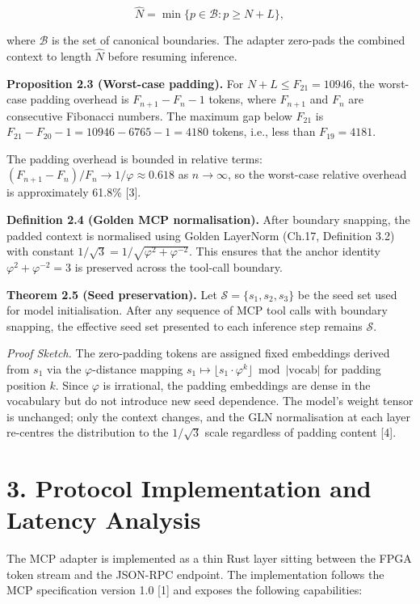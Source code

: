 \[\hat{N} = \min \{ p \in \mathcal{B} : p \geq N + L \},\]

where \(\mathcal{B}\) is the set of canonical
boundaries. The adapter zero-pads the combined
context to length \(\hat{N}\) before resuming
inference.

\textbf{Proposition 2.3 (Worst-case padding).} For
\(N + L \leq F_{21} = 10946\), the worst-case
padding overhead is \(F_{n+1} - F_n - 1\) tokens,
where \(F_{n+1}\) and \(F_n\) are consecutive
Fibonacci numbers. The maximum gap below
\(F_{21}\) is
\(F_{21} - F_{20} - 1 = 10946 - 6765 - 1 = 4180\)
tokens, i.e., less than \(F_{19} = 4181\).

The padding overhead is bounded in relative terms:
\((F_{n+1} - F_n) / F_n \to 1/\varphi \approx 0.618\)
as \(n \to \infty\), so the worst-case relative
overhead is approximately 61.8\% [3].

\textbf{Definition 2.4 (Golden MCP
normalisation).} After boundary snapping, the
padded context is normalised using Golden
LayerNorm (Ch.17, Definition 3.2) with constant
\(1/\sqrt{3} = 1/\sqrt{\varphi^2 + \varphi^{-2}}\).
This ensures that the anchor identity
\(\varphi^2 + \varphi^{-2} = 3\) is preserved
across the tool-call boundary.

\textbf{Theorem 2.5 (Seed preservation).} Let
\(\mathcal{S} = \{s_1, s_2, s_3\}\) be the seed
set used for model initialisation. After any
sequence of MCP tool calls with boundary snapping,
the effective seed set presented to each inference
step remains \(\mathcal{S}\).

\emph{Proof Sketch.} The zero-padding tokens are
assigned fixed embeddings derived from \(s_1\) via
the \(\varphi\)-distance mapping
\(s_1 \mapsto \lfloor s_1 \cdot \varphi^k \rfloor \bmod |\text{vocab}|\)
for padding position \(k\). Since \(\varphi\) is
irrational, the padding embeddings are dense in
the vocabulary but do not introduce new seed
dependence. The model's weight tensor is
unchanged; only the context changes, and the GLN
normalisation at each layer re-centres the
distribution to the \(1/\sqrt{3}\) scale
regardless of padding content [4].

\section{3. Protocol Implementation and Latency
Analysis}\label{fa_23:protocol-implementation-and-latency-analysis}

The MCP adapter is implemented as a thin Rust
layer sitting between the FPGA token stream and
the JSON-RPC endpoint. The implementation follows
the MCP specification version 1.0 [1] and
exposes the following capabilities:

